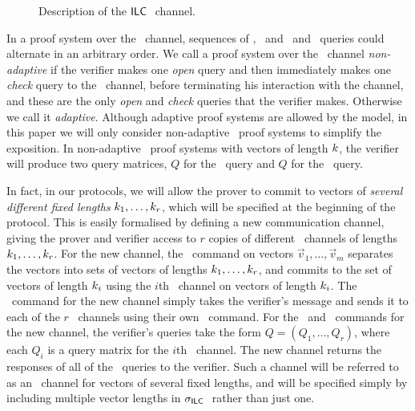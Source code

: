 \begin{figure}[htb]
\caption{Description of the $\mathsf{ILC}~$ channel.}\label{ILCSyntaxFigure11}
\end{figure}

In a proof system over the \ILC\ channel, sequences of \ILCcommit, \ILCsend\ and \ILCopen\ and \ILCcheck\ queries could alternate in an arbitrary order. We call a proof system over the \ILC\ channel \emph{non-adaptive} if the verifier makes one \emph{open} query and then immediately makes one \emph{check} query to the \ILC\ channel, before terminating his interaction with the channel, and these are the only \emph{open} and \emph{check} queries that the verifier makes. Otherwise we call it \emph{adaptive}. Although adaptive proof systems are allowed by the model, in this paper we will only consider non-adaptive \ILC\ proof systems to simplify the exposition. In non-adaptive \ILC\ proof systems with vectors of length $k$, the verifier will produce two query matrices, $Q$ for the \ILCopen\ query and $Q$ for the \ILCcheck\ query. 

In fact, in our protocols, we will allow the prover to commit to vectors of \emph{several different fixed lengths} $k_1,\ldots,k_r$, which will be specified at the beginning of the protocol. This is easily formalised by defining a new communication channel, giving the prover and verifier access to $r$ copies of different \ILC\ channels of lengths $k_1,\ldots,k_r$. For the new channel, the \ILCcommit\ command on vectors $\vec{v}_1,\ldots,\vec{v}_m$ separates the vectors into sets of vectors of lengths $k_1,\ldots,k_r$, and commits to the set of vectors of length $k_i$ using the $i$th \ILC\ channel on vectors of length $k_i$. The \ILCsend\ command for the new channel simply takes the verifier's message and sends it to each of the $r$ \ILC\ channels using their own \ILCsend\ command. For the \ILCopen\ and \ILCcheck\ commands for the new channel, the verifier's queries take the form $Q = (Q_1,\ldots,Q_r)$, where each $Q_i$ is a query matrix for the $i$th \ILC\ channel. The new channel returns the responses of all of the \ILC\ queries to the verifier. Such a channel will be referred to as an \ILC\ channel for vectors of several fixed lengths, and will be specified simply by including multiple vector lengths in $\mathsf{\sigma}_{\mathsf{ILC}~}$ rather than just one.

